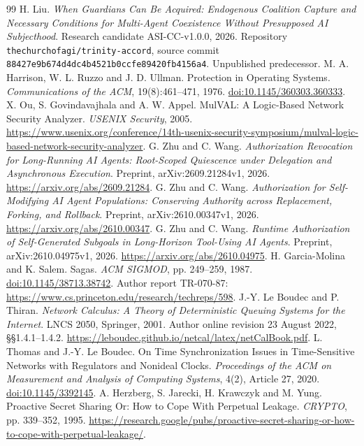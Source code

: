 \begin{thebibliography}{99}\small
{} H. Liu. \emph{When Guardians Can Be Acquired: Endogenous Coalition Capture and Necessary Conditions for Multi-Agent Coexistence Without Presupposed AI Subjecthood}. Research candidate ASI-CC-v1.0.0, 2026. Repository \texttt{thechurchofagi/trinity-accord}, source commit \nolinkurl{88427e9b674d4dc4b4521b0ccfe89420fb4156a4}. Unpublished predecessor.
 M. A. Harrison, W. L. Ruzzo and J. D. Ullman. Protection in Operating Systems. \emph{Communications of the ACM}, 19(8):461--471, 1976. \href{https://doi.org/10.1145/360303.360333}{doi:10.1145/360303.360333}.
 X. Ou, S. Govindavajhala and A. W. Appel. MulVAL: A Logic-Based Network Security Analyzer. \emph{USENIX Security}, 2005. \url{https://www.usenix.org/conference/14th-usenix-security-symposium/mulval-logic-based-network-security-analyzer}.
 G. Zhu and C. Wang. \emph{Authorization Revocation for Long-Running AI Agents: Root-Scoped Quiescence under Delegation and Asynchronous Execution}. Preprint, arXiv:2609.21284v1, 2026. \url{https://arxiv.org/abs/2609.21284}.
 G. Zhu and C. Wang. \emph{Authorization for Self-Modifying AI Agent Populations: Conserving Authority across Replacement, Forking, and Rollback}. Preprint, arXiv:2610.00347v1, 2026. \url{https://arxiv.org/abs/2610.00347}.
 G. Zhu and C. Wang. \emph{Runtime Authorization of Self-Generated Subgoals in Long-Horizon Tool-Using AI Agents}. Preprint, arXiv:2610.04975v1, 2026. \url{https://arxiv.org/abs/2610.04975}.
 H. Garcia-Molina and K. Salem. Sagas. \emph{ACM SIGMOD}, pp. 249--259, 1987. \href{https://doi.org/10.1145/38713.38742}{doi:10.1145/38713.38742}. Author report TR-070-87: \url{https://www.cs.princeton.edu/research/techreps/598}.
 J.-Y. Le Boudec and P. Thiran. \emph{Network Calculus: A Theory of Deterministic Queuing Systems for the Internet}. LNCS 2050, Springer, 2001. Author online revision 23 August 2022, \S\S1.4.1--1.4.2. \url{https://leboudec.github.io/netcal/latex/netCalBook.pdf}.
 L. Thomas and J.-Y. Le Boudec. On Time Synchronization Issues in Time-Sensitive Networks with Regulators and Nonideal Clocks. \emph{Proceedings of the ACM on Measurement and Analysis of Computing Systems}, 4(2), Article 27, 2020. \href{https://doi.org/10.1145/3392145}{doi:10.1145/3392145}.
 A. Herzberg, S. Jarecki, H. Krawczyk and M. Yung. Proactive Secret Sharing Or: How to Cope With Perpetual Leakage. \emph{CRYPTO}, pp. 339--352, 1995. \url{https://research.google/pubs/proactive-secret-sharing-or-how-to-cope-with-perpetual-leakage/}.

\end{thebibliography}
